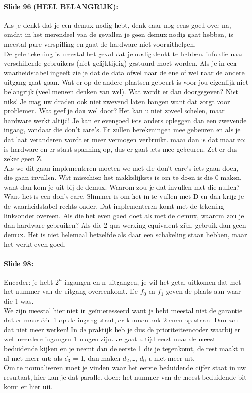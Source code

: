 \documentclass[10pt,a4paper]{book}
\begin{document}
\paragraph{Slide 96 (HEEL BELANGRIJK):} Als je denkt dat je een demux nodig hebt, denk daar nog eens goed over na, omdat in het merendeel van de gevallen je geen demux nodig gaat hebben, is meestal pure verspilling en gaat de hardware niet vooruithelpen.\\
De gele tekening is meestal het geval dat je nodig denkt te hebben: info die naar verschillende gebruikers (niet gelijktijdig) gestuurd moet worden. Als je in een waarheidstabel ingeeft zie je dat de data ofwel naar de ene of wel naar de andere uitgang gaat gaan. Wat er  op de andere plaatsen gebeurt is voor jou eigenlijk niet belangrijk (veel mensen denken van wel). Wat wordt er dan doorgegeven? Niet niks! Je mag uw draden ook niet zwevend laten hangen want dat zorgt voor problemen. Wat geef je dan wel door? Het kan u niet zoveel schelen, maar hardware werkt altijd! Je kan er evengoed iets anders opleggen dan een zwevende ingang, vandaar die don't care's. Er zullen berekeningen mee gebeuren en als je dat laat veranderen wordt er meer vermogen verbruikt, maar dan is dat maar zo: is hardware en er staat spanning op, dus er gaat iets mee gebeuren. Zet er dus zeker geen Z.\\
Als we dit gaan implementeren moeten we met die don't care's iets gaan doen, die gaan invullen. Wat misschien het makkelijkste is om te doen is die 0 maken, want dan kom je uit bij de demux. Waarom zou je dat invullen met die nullen? Want het is een don't care. Slimmer is om het in te vullen met D en dan krijg je de waarheidstabel rechts onder. Dat implementeren komt met de tekening linksonder overeen. Als die het even goed doet als met de demux, waarom zou je dan hardware gebruiken? Als die 2 qua werking equivalent zijn, gebruik dan geen demux. Het is niet helemaal hetzelfde als daar een schakeling staan hebben, maar het werkt even goed.

\paragraph{Slide 98:} Encoder: je hebt $2^n$ ingangen en n uitgangen, je wil het getal uitkomen dat met het nummer van de uitgang overeenkomt. De $f_0$ en $f_1$ geven de plaats aan waar die 1 was.\\
We zijn meestal hier niet in ge\"interesseerd want je hebt meestal niet de garantie dat er maar \'e\'en 1 op de ingang staat, er kunnen ook 2 enen op staan. Dan zou dat niet meer werken! In de praktijk heb je dus de prioriteitsencoder waarbij er wel meerdere ingangen 1 mogen zijn. Je gaat altijd eerst naar de meest beduidende kijken en je neemt dan de eerste 1 die je tegenkomt, de rest maakt u al niet meer uit: als $d_3$ = 1, dan maken $d_2$,\ldots, $d_0$ u niet meer uit.\\
Om te normaliseren moet je vinden waar het eerste beduidende cijfer staat in uw resultaat, hier kan je dat parallel doen: het nummer van de meest beduidende bit komt er hier uit.
\end{document}
